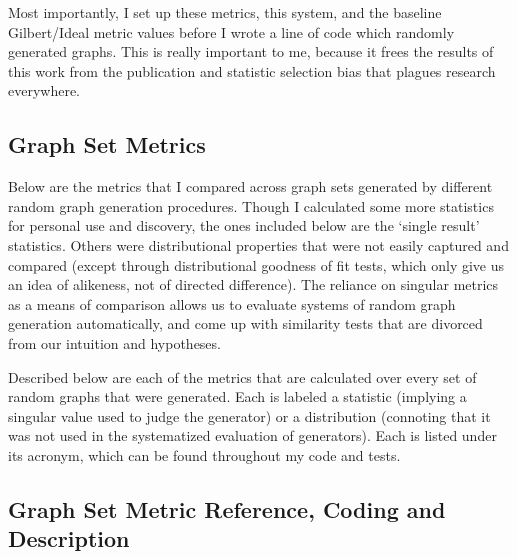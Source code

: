 Most importantly, I set up these metrics, this system, and the baseline Gilbert/Ideal metric values before I wrote a line of code which randomly generated graphs.
This is really important to me, because it frees the results of this work from the publication and statistic selection bias that plagues research everywhere.

\subsection{Graph Set Metrics}
Below are the metrics that I compared across graph sets generated by different random graph generation procedures.
Though I calculated some more statistics for personal use and discovery, the ones included below are the `single result' statistics.
Others were distributional properties that were not easily captured and compared (except through distributional goodness of fit tests, which only give us an idea of alikeness, not of directed difference).
The reliance on singular metrics as a means of comparison allows us to evaluate systems of random graph generation automatically, and come up with similarity tests that are divorced from our intuition and hypotheses.

Described below are each of the metrics that are calculated over every set of random graphs that were generated.
Each is labeled a statistic (implying a singular value used to judge the generator) or a distribution (connoting that it was not used in the systematized evaluation of generators).
Each is listed under its acronym, which can be found throughout my code and tests. 

\subsection{Graph Set Metric Reference, Coding and Description}

